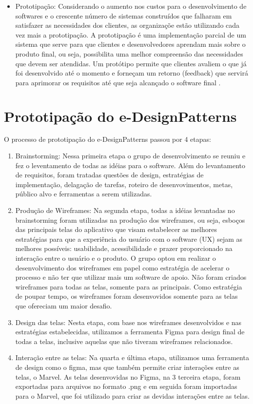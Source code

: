 \begin{itemize}
	\item Prototipação: Considerando o aumento nos custos para o desenvolvimento de softwares e o crescente número de sistemas construídos que falharam em satisfazer as necessidades dos clientes, as organizaçõe estão utilizando cada vez mais a prototipação. A prototipação é  uma implementação parcial de um sistema que serve para que clientes e desenvolvedores aprendam mais sobre o produto final, ou seja, possibilita uma melhor compreensão das necessidades que devem ser atendidas. Um protótipo permite que clientes avaliem o que já foi desenvolvido até o momento e forneçam um retorno (feedback) que servirá para aprimorar os requisitos até que seja alcançado o software final \cite{davis1992operational}. 
\end{itemize}

\section{Prototipação do e-DesignPatterns}

O processo de prototipação do e-DesignPatterns passou por 4 etapas:

\begin{enumerate}
	\item Brainstorming: Nessa primeira etapa o grupo de desenvolvimento se reuniu e fez o leventamento de todas as idéias para o software. Além do levantamento de requisitos, foram tratadas questões de design, estratégias de implementação, delagação de tarefas, roteiro de desenvovimentos, metas, público alvo e ferramentas a serem utilizadas. 
	\item Produção de Wireframes: Na segunda etapa, todas a idéias levantadas no brainstorming foram utilizadas na produção dos wireframes, ou seja, esboços das principais telas do aplicativo que visam estabelecer as melhores estratégias para que a experiência do usuário com o software (UX) sejam as melhores possíveis: usabilidade, acessibilidade e prazer proporcionado na interação entre o usuário e o produto. O grupo optou em realizar o desenvolvimento dos wireframes em papel como estratégia de acelerar o processo e não ter que utilizar mais um software de apoio. Não foram criados wireframes para todas as telas, somente para as principais. Como estratégia de poupar tempo, os wireframes foram desenvovidos somente para as telas que ofereciam um maior desafio.
	\item Design das telas: Nesta etapa, com base nos wireframes desenvolvidos e nas estratégias estabelecidas, utilizamos a ferramenta Figma para design final de todas a telas, inclusive aquelas que não tiveram wireframes relacionados. 
	\item Interação entre as telas: Na quarta e última etapa, utilizamos uma ferramenta de design como o figma, mas que também permite criar interações entre as telas, o Marvel. As telas desenvovidas no Figma, na 3 terceira etapa, foram exportadas para arquivos no formato .png e em seguida foram importadas para o Marvel, que foi utilizado para criar as devidas interações entre as telas.
\end{enumerate}


